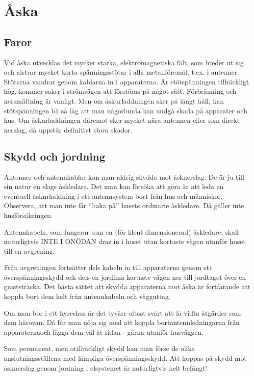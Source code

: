 \section{Åska}

\subsection{Faror}

Vid åska utvecklas det mycket starka, elektromagnetiska fält, som
breder ut sig och alstrar mycket korta spänningsstötar i alla
metallföremål, t.ex. i antenner. Stötarna vandrar genom kablarna in i
apparaterna. Är stötspänningen tillräckligt hög, kommer saker i
strömvägen att förstöras på något sätt.  Förbränning och nersmältning
är vanligt.  Men om åskurladdningen sker på långt håll, kan
stötspänningen bli så låg att man någorlunda kan undgå skada på
apparater och hus. Om åskurladdningen däremot sker mycket nära
antennen eller som direkt nerslag, då uppstår definitivt stora skador.

\subsection{Skydd och jordning}

Antenner och antennkablar kan man aldrig skydda mot åsknerslag. De är
ju till sin natur en slags åskledare. Det man kan försöka att göra är
att leda en eventuell åskurladdning i ett antennsystem bort från hus
och människor. Observera, att man inte får ``haka på'' husets
ordinarie åskledare. Då gäller inte husförsäkringen.

Antennkabeln, som fungerar som en (för klent dimensionerad) åskledare,
skall naturligtvis INTE I ONÖDAN dras in i huset utan kortaste vägen
utanför huset till en avgrening.

Från avgreningen fortsätter dels kabeln in till apparaterna genom ett
överspänningsskydd och dels en jordlina kortaste vägen ner till
jordtaget över en gniststräcka. Det bästa sättet att skydda
apparaterna mot åska är fortfarande att koppla bort dem helt från
antennkabeln och vägguttag.

Om man bor i ett hyreshus är det tyvärr oftast svårt att få vidta
åtgärder som dem härovan. Då får man nöja sig med att koppla
bortantennledningarna från apparaternaoch lägga dem väl åt sidan -
gärna utanför husväggen.

Som permanent, men otillräckligt skydd kan man förse de olika
anslutningsställena med lämpliga överspänningsskydd.  Att hoppas på
skydd mot åsknerslag genom jordning i elsystemet är naturligtvis
helt befängt!
